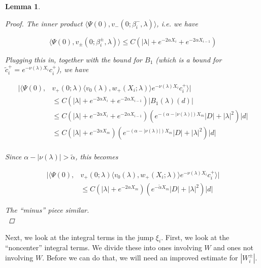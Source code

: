 \documentclass[12pt]{article}
\newtheorem{lemma}{Lemma}
\begin{document}
\begin{lemma}
\begin{proof}
The inner product $\langle \Psi(0), v_-(0; \beta_i^-, \lambda) \rangle$, i.e. we have

\begin{equation}\label{vpsiIP}
\langle \Psi(0), v_\pm(0; \beta_i^\pm, \lambda) \rangle \leq C ( |\lambda| + e^{-2 \alpha X_i} + e^{-2 \alpha X_{i-1}} )
\end{equation}

Plugging this in, together with the bound for $B_1$ (which is a bound for $\tilde{c}_i^+ = e^{-\nu(\lambda)X_i} c_i^+$), we have

\begin{align*}
|\langle \Psi(0), &v_+(0; \lambda) \langle v_0(\lambda), w_+(X_i; \lambda) \rangle e^{-\nu(\lambda)X_i} c_i^+ \rangle| \\ 
&\leq C ( |\lambda| + e^{-2 \alpha X_i} + e^{-2 \alpha X_{i-1}} ) |B_1(\lambda)(d)| \\
&\leq C ( |\lambda| + e^{-2 \alpha X_i} + e^{-2 \alpha X_{i-1}} )
( e^{-(\alpha - |\nu(\lambda)|) X_m} |D| + |\lambda|^2 )|d| \\
&\leq C ( |\lambda| + e^{-2 \alpha X_m} )
( e^{-(\alpha - |\nu(\lambda)|) X_m} |D| + |\lambda|^2 )|d| \\
\end{align*}

Since $\alpha - |\nu(\lambda)| > \tilde{\alpha}$, this becomes 

\begin{align*}
|\langle \Psi(0), &v_+(0; \lambda) \langle v_0(\lambda), w_+(X_i; \lambda) \rangle e^{-\nu(\lambda)X_i} c_i^+ \rangle| \\
&\leq C ( |\lambda| + e^{-2 \alpha X_m} )
( e^{-\tilde{\alpha} X_m} |D| + |\lambda|^2 )|d| 
\end{align*}
 
The ``minus'' piece similar.\\

\end{proof} 
\end{lemma}

Next, we look at the integral terms in the jump $\xi_i$. First, we look at the ``noncenter'' integral terms. We divide these into ones involving $W$ and ones not involving $W$. Before we can do that, we will need an improved estimate for $|W_i^\pm|$.
\end{document}
